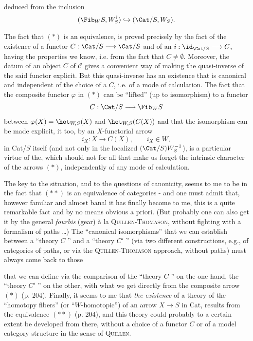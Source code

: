 deduced from the inclusion
\[
(\Fib_W S, W^{\mathrm{f}}_S) \hookrightarrow (\Cat/S, W_S).
\]

The fact that $(*)$ is an equivalence, is proved precisely by the fact of the existence of a functor $C : \Cat/S \longrightarrow \Cat/S$ and of an $i : \id_{\Cat/S} \longrightarrow C$, having the properties we know, i.e. from the fact that $C \neq \emptyset$. Moreover, the datum of an object $C$ of $\mathcal{C}$ gives a convenient way of making the quasi-inverse of the said functor explicit. But this quasi-inverse has an existence that is canonical and independent of the choice of a $C$, i.e. of a mode of calculation. The fact that the composite functor $\varphi$ in $(*)$ can be ``lifted'' (up to isomorphism) to a functor %
\[
C : \Cat/S \longrightarrow \Fib_W S
\]
between $\varphi(X) = \hot_{W,S}(X)$ and $\hot_{W,S}(C(X))$ and that the isomorphism can be made explicit, it too, by an $X$-functorial arrow
\[
i_X : X \longrightarrow C(X), \qquad i_X \in W,
\]
in Cat/$S$ itself (and not only in the localized $(\Cat/S)W_S^{-1}$),
is a particular virtue of the, which should not for all that make us forget the intrinsic character of the arrows $(*)$, independently of any mode of calculation.

{\reversemarginpar\marginnote{$\|$}}%
The key to the situation, and to the questions of canonicity, seems to me to be in the fact that $(**)$ is an equivalence of categories - and one must admit that, however familiar and almost banal it has finally become to me, this is a quite remarkable fact and by no means obvious a priori. (But probably one can also get it by the general \textit{fourbis} (gear) à la \textsc{Quillen-Thomason}, without fighting with a formalism of paths \dots) The ``canonical isomorphisms'' that we can establish between a ``theory $C$ '' and a ``theory $C'$ '' (via two different constructions, e.g., of categories of paths, or via the \textsc{Quillen-Thomason} approach, without paths) must always come back to those

that we can define via the comparison of the ``theory $C$ '' on the one hand, the ``theory $C'$ '' on the other, with what we get directly from the composite arrow $(*)$ (p. 204). Finally, it seems to me that \textit{the existence} of a theory of the ``homotopy fibers'' (or ``$W$-homotopic'') of an arrow $X \longrightarrow S$ in Cat, results from the equivalence $(**)$ (p. 204), and this theory could probably to a certain extent be developed from there, without a choice of a functor $C$ or of a model category structure in the sense of \textsc{Quillen}. %

